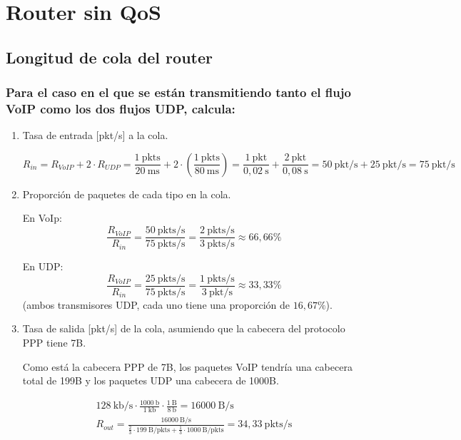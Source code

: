 \chapter{Router sin QoS}
\label{chap:sinqos}

\section{Longitud de cola del router}

\subsection{Para el caso en el que se están transmitiendo tanto el flujo VoIP como los dos flujos UDP, calcula:}

\renewcommand{\theenumi}{\alph{enumi}}
\begin{enumerate}
    \item Tasa de entrada [pkt/s] a la cola.

\[
\label{eq:sinqos_tasa_entrada}
R_{in} = R_{VoIP} + 2 \cdot R_{UDP} = \frac{1~\mathrm{pkts}}{20~\text{ms}} + 2 \cdot \left(\frac{1 ~ \text{pkts} }{80 ~ \text{ms} }\right) = \frac{1~\mathrm{pkt}}{0,02~\text{s}} + \frac{2~\mathrm{pkt}}{0,08~\text{s}} = 50 ~ \text{pkt/s} + 25 ~ \text{pkt/s} = 75 ~ \text{pkt/s}
\]

    \item Proporción de paquetes de cada tipo en la cola.

    En VoIp: \[ \frac{R_{VoIP}}{R_{in}} = \frac{50~\text{pkts/s}}{75~\text{pkts/s}} = \frac{2~\text{pkts/s}}{3~\text{pkts/s}}  \approx 66,66\%\]

    En UDP: \[ \frac{R_{VoIP}}{R_{in}} = \frac{25~\text{pkts/s}}{75~\text{pkts/s}} = \frac{1~\text{pkts/s}}{3~\text{pkt/s}} \approx 33,33\% \] 
            (ambos transmisores UDP, cada uno tiene una proporción de \( 16,67\% \)).

    \item Tasa de salida [pkt/s] de la cola, asumiendo que la cabecera del protocolo PPP tiene 7B.
 
    Como está la cabecera PPP de 7B, los paquetes VoIP tendría una cabecera total de 199B y los paquetes UDP una cabecera de 1000B.

    \begin{eqnarray}
        \label{eq:senqos_tasa_salida}
        128~\text{kb/s} \cdot \frac{1000~\text{b}}{1~\text{kb}} \cdot \frac{1~\text{B}}{8~\text{b}} = 16000~\text{B/s} \\
        R_{out} = \frac{16000~\text{B/s}}{ \frac{2}{3} \cdot  199~\text{B/pkts} + \frac{1}{3} \cdot 1000~\text{B/pkts}} = 34,33~\text{pkts/s}
    \end{eqnarray}



\end{enumerate}
